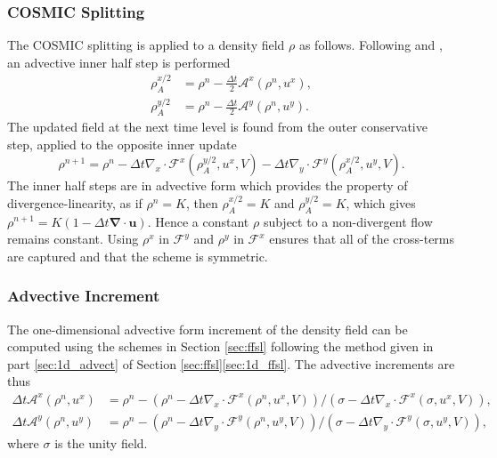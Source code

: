 \documentclass{ametsocV6.1}
\begin{document}
\subsubsection{COSMIC Splitting} \label{sec:cosmic_density}
The COSMIC splitting is applied to a density field $\rho$ as follows.
Following \citet{leonard1996cosmic} and \citet{lin1996ffsl}, an advective inner half step is performed
\begin{subequations}
\begin{align}
    \rho_A^{x/2} &= \rho^n - \frac{\Delta{t}}{2} \mathcal{A}^x(\rho^n, u^x), \\
    \rho_A^{y/2} &= \rho^n - \frac{\Delta{t}}{2} \mathcal{A}^y(\rho^n, u^y).
\end{align}
\end{subequations}
The updated field at the next time level is found from the outer conservative step, applied to the opposite inner update
\begin{equation} \label{eqn:cosmic_density}
    \rho^{n+1} = \rho^{n} - \Delta{t} \nabla_x\cdot \mathcal{F}^x(\rho_A^{y/2},u^x,V) - \Delta{t} \nabla_y \cdot \mathcal{F}^y(\rho_A^{x/2},u^y,V).
\end{equation}
The inner half steps are in advective form which provides the property of divergence-linearity, as if $\rho^n=K$, then $\rho_A^{x/2}=K$ and $\rho_A^{y/2}=K$, which gives $\rho^{n+1}=K(1-\Delta t\bm{\nabla\cdot u})$.
Hence a constant $\rho$ subject to a non-divergent flow remains constant. Using $\rho^x$ in $\mathcal{F}^y$ and $\rho^y$ in $\mathcal{F}^x$ ensures that all of the cross-terms are captured \citep{kent2019crossterms} and that the scheme is symmetric. 

\subsubsection{Advective Increment} \label{sec:advective_increment}

The one-dimensional advective form increment of the density field can be computed using the schemes in Section \ref{sec:ffsl} following the method given in part \ref{sec:1d_advect} of Section \ref{sec:ffsl}\ref{sec:1d_ffsl}. The advective increments are thus
\begin{subequations} \label{eqn:advective_operators}
\begin{align}
    \Delta{t} \mathcal{A}^x(\rho^n, u^x) &= \rho^n - \left( \rho^n - \Delta{t} \nabla_x\cdot \mathcal{F}^x(\rho^n,u^x,V)\right)/\left( \sigma - \Delta{t} \nabla_x\cdot \mathcal{F}^x(\sigma,u^x,V)\right), \\
    \Delta{t} \mathcal{A}^y(\rho^n, u^y) &= \rho^n - \left( \rho^n - \Delta{t} \nabla_y\cdot \mathcal{F}^y(\rho^n,u^y,V)\right)/\left( \sigma - \Delta{t} \nabla_y\cdot \mathcal{F}^y(\sigma,u^y,V)\right),
\end{align}
\end{subequations}
where $\sigma$ is the unity field.
\end{document}
